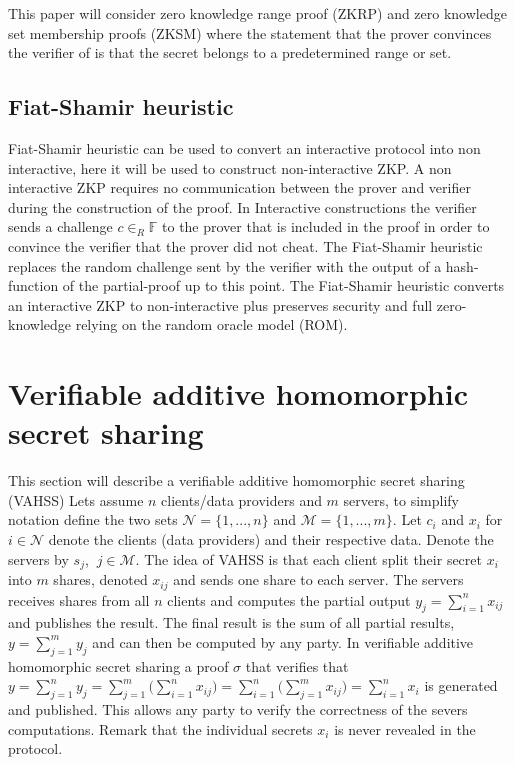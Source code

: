 This paper will consider zero knowledge range proof (ZKRP) and zero knowledge set membership proofs (ZKSM) where the statement that the prover convinces the verifier of is that the secret belongs to a predetermined range or set.


\subsection*{Fiat-Shamir heuristic}
 Fiat-Shamir heuristic \cite{Fiat-Shamir} can be used to convert an interactive protocol into non interactive, here it will be used to construct non-interactive ZKP. A non interactive  ZKP requires no communication between the prover and verifier during the construction of the proof. In Interactive constructions the verifier sends a challenge $c\in_R\mathds{F}$ to the prover that is included in the proof in order to convince the verifier that the prover did not cheat. The Fiat-Shamir heuristic replaces the random challenge sent by the verifier with the output of a hash-function of the partial-proof up to this point. The Fiat-Shamir heuristic converts an interactive ZKP to non-interactive plus preserves security and full zero-knowledge relying on the random oracle model (ROM). 

\section{Verifiable additive homomorphic secret sharing}
\label{sec:VAHSS}

This section will describe a verifiable additive homomorphic secret sharing (VAHSS) Lets assume  $n$ clients/data providers and $m$ servers, to simplify notation define the two sets $\mathcal{N}=\{1,...,n\}$ and $\mathcal{M} = \{1,...,m\}$. Let $c_i$ and $x_i$ for $i\in\mathcal{N}$ denote the clients (data providers) and their respective data. Denote the servers by $s_j$, $\:j\in\mathcal{M}$. The idea of VAHSS is that each client split their secret $x_i$ into $m$ shares, denoted $x_{ij}$ and sends one share to each server. The servers receives shares from all $n$ clients and computes the partial output $y_j = \sum_{i=1}^n x_{ij} $ and publishes the result. The final result is the sum of all partial results, $y = \sum_{j=1}^m y_j$ and can then be computed by any party. In verifiable additive homomorphic secret sharing a proof $\sigma$ that verifies that $y= \sum_{j=1}^n y_j= \sum_{j=1}^m \big( \sum_{i=1}^n  x_{ij} \big) =  \sum_{i=1}^n \big( \sum_{j=1}^m  x_{ij} \big)  = \sum_{i=1}^n x_i$ is generated and published. This allows any party to verify the correctness of the severs computations. Remark that the individual secrets $x_i$ is never revealed in the protocol.


